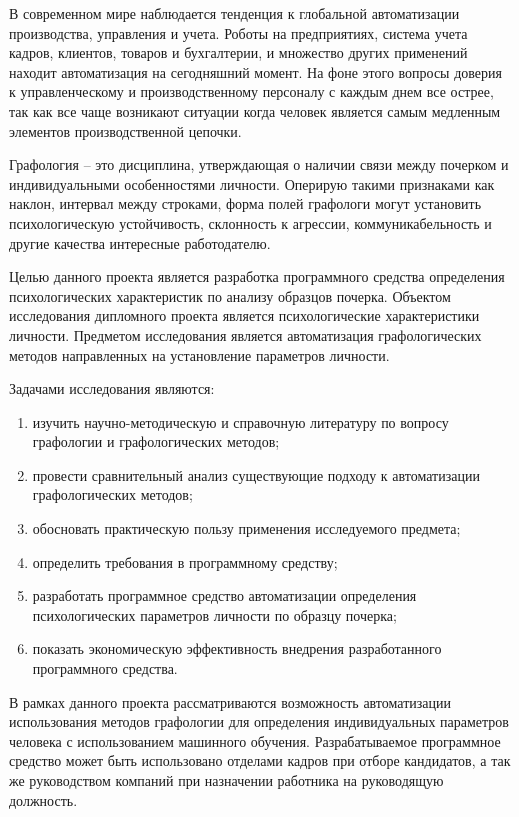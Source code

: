\label{sec:intro}

В современном мире наблюдается тенденция к глобальной автоматизации производства, управления и учета. Роботы на предприятиях, система учета кадров, клиентов, товаров и бухгалтерии, и множество других применений находит автоматизация на сегодняшний момент.
На фоне этого вопросы доверия к управленческому и производственному персоналу с каждым днем все острее, так как все чаще возникают ситуации когда человек является самым медленным элементов производственной цепочки.

Графология – это дисциплина, утверждающая о наличии связи между почерком и индивидуальными особенностями личности. Оперирую такими признаками как наклон, интервал между строками, форма полей графологи могут установить психологическую устойчивость, склонность к агрессии, коммуникабельность и другие качества интересные работодателю.

Целью данного проекта является разработка программного средства определения психологических характеристик по анализу образцов почерка.
Объектом исследования дипломного проекта является психологические характеристики личности.
Предметом исследования является автоматизация графологических методов направленных на установление параметров личности.

Задачами исследования являются:
\begin{enumerate}
  \item изучить научно-методическую и справочную литературу по вопросу графологии и графологических методов;
  \item провести сравнительный анализ существующие подходу к автоматизации графологических методов;
  \item обосновать практическую пользу применения исследуемого \mbox{предмета};
  \item определить требования в программному средству;
  \item разработать программное средство автоматизации определения психологических параметров личности по образцу почерка;
  \item показать экономическую эффективность внедрения разработанного программного средства.
\end{enumerate}

В рамках данного проекта рассматриваются возможность автоматизации использования методов графологии для определения индивидуальных параметров человека с использованием машинного обучения.
Разрабатываемое программное средство может быть использовано отделами кадров при отборе кандидатов, а так же руководством компаний при назначении работника на руководящую должность.